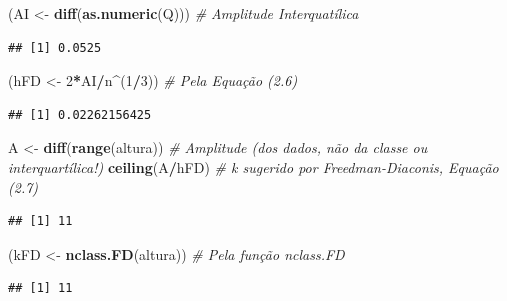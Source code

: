 \documentclass[
]{book}
\newenvironment{Shaded}{\begin{snugshade}}{\end{snugshade}}
\newcommand{\CommentTok}[1]{\textcolor[rgb]{0.56,0.35,0.01}{\textit{#1}}}
\newcommand{\DecValTok}[1]{\textcolor[rgb]{0.00,0.00,0.81}{#1}}
\newcommand{\KeywordTok}[1]{\textcolor[rgb]{0.13,0.29,0.53}{\textbf{#1}}}
\newcommand{\NormalTok}[1]{#1}
\newcommand{\OperatorTok}[1]{\textcolor[rgb]{0.81,0.36,0.00}{\textbf{#1}}}
\newcommand{\StringTok}[1]{\textcolor[rgb]{0.31,0.60,0.02}{#1}}
\theoremstyle{definition}
\theoremstyle{definition}
\theoremstyle{definition}
\theoremstyle{remark}
\begin{document}
\begin{Shaded}
\begin{Highlighting}[]
\NormalTok{(AI \textless{}{-}}\StringTok{ }\KeywordTok{diff}\NormalTok{(}\KeywordTok{as.numeric}\NormalTok{(Q)))     }\CommentTok{\# Amplitude Interquatílica}
\end{Highlighting}
\end{Shaded}

\begin{verbatim}
## [1] 0.0525
\end{verbatim}

\begin{Shaded}
\begin{Highlighting}[]
\NormalTok{(hFD \textless{}{-}}\StringTok{ }\DecValTok{2}\OperatorTok{*}\NormalTok{AI}\OperatorTok{/}\NormalTok{n}\OperatorTok{\^{}}\NormalTok{(}\DecValTok{1}\OperatorTok{/}\DecValTok{3}\NormalTok{))           }\CommentTok{\# Pela Equação (2.6)}
\end{Highlighting}
\end{Shaded}

\begin{verbatim}
## [1] 0.02262156425
\end{verbatim}

\begin{Shaded}
\begin{Highlighting}[]
\NormalTok{A \textless{}{-}}\StringTok{ }\KeywordTok{diff}\NormalTok{(}\KeywordTok{range}\NormalTok{(altura))        }\CommentTok{\# Amplitude (dos dados, não da classe ou interquartílica!)}
\KeywordTok{ceiling}\NormalTok{(A}\OperatorTok{/}\NormalTok{hFD)                  }\CommentTok{\# k sugerido por Freedman{-}Diaconis, Equação (2.7)}
\end{Highlighting}
\end{Shaded}

\begin{verbatim}
## [1] 11
\end{verbatim}

\begin{Shaded}
\begin{Highlighting}[]
\NormalTok{(kFD \textless{}{-}}\StringTok{ }\KeywordTok{nclass.FD}\NormalTok{(altura))      }\CommentTok{\# Pela função \textquotesingle{}nclass.FD\textquotesingle{}}
\end{Highlighting}
\end{Shaded}

\begin{verbatim}
## [1] 11
\end{verbatim}
\end{document}
